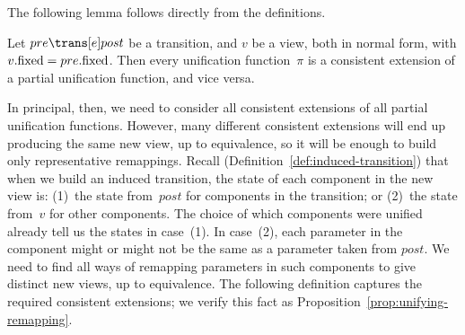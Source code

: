 
The following lemma follows directly from the definitions.
%
\begin{lemma}
Let $pre \trans[e] post$ be a transition, and $v$ be a view, both in normal
form, with $v.\mathrm{fixed} = pre.\mathrm{fixed}$.  Then every unification function~$\pi$ is
a consistent extension of a partial unification function, and vice versa.
\end{lemma}

In principal, then, we need to consider all consistent extensions of all
partial unification functions.  However, many different consistent extensions
will end up producing the same new view, up to equivalence, so it will be
enough to build only representative remappings.  Recall
(Definition~\ref{def:induced-transition}) that when we build an induced
transition, the state of each component in the new view is: (1)~the state
from~$post$ for components in the transition; or (2)~the state from~$v$ for
other components.  The choice of which components were unified already tell us
the states in case~(1).  In case~(2), each parameter in the component might or
might not be the same as a parameter taken from $post$.  We need to find all
ways of remapping parameters in such components to give distinct new views, up
to equivalence.  The following definition captures the required consistent
extensions; we verify this fact as Proposition~\ref{prop:unifying-remapping}.



